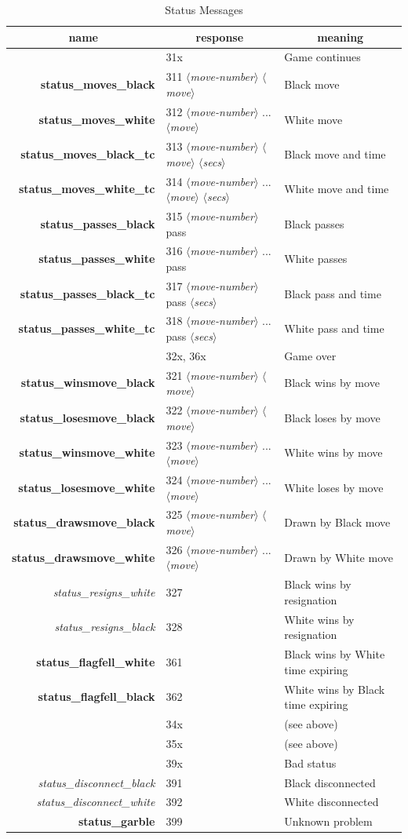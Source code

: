 \documentclass{article}
\newenvironment{resptab}[2]{
\begin{table}%
\centering
\caption{#2}%
\label{table-#1}%
\begin{tabular}{rll}%
\multicolumn{1}{c}{\bf name}&%
\multicolumn{1}{c}{\bf response}&%
\multicolumn{1}{c}{\bf meaning}\\\hline
}{\end{tabular}%
\end{table}}
\newcommand{\stok}[1]{{$\langle${\em #1}$\rangle$}}
\newcommand{\bfid}[1]{{\bf #1}}
\newcommand{\itid}[1]{{\it #1}}
\begin{document}
\begin{resptab}{statusmsgs}{Status Messages}
& 31x			     & Game continues \\
\bfid{status\_moves\_black} & 311 \stok{move-number} \stok{move}     & Black move \\
\bfid{status\_moves\_white} & 312 \stok{move-number} ... \stok{move} & White move \\
\bfid{status\_moves\_black\_tc} & 313 \stok{move-number}
                                  \stok{move}
				  \stok{secs}
				& Black move and time\\
\bfid{status\_moves\_white\_tc} & 314 \stok{move-number}
			  ... \stok{move}
			  \stok{secs}
			& White move and time \\
\bfid{status\_passes\_black} & 315 \stok{move-number} pass & Black passes \\
\bfid{status\_passes\_white} & 316 \stok{move-number}
... pass & White passes \\
\bfid{status\_passes\_black\_tc} & 317 \stok{move-number}
pass \stok{secs} & Black pass and time \\
\bfid{status\_passes\_white\_tc} & 318 \stok{move-number}
... pass \stok{secs} & White pass and time \\
& 32x, 36x			     & Game over \\
\bfid{status\_winsmove\_black} & 321 \stok{move-number} \stok{move}     & Black wins by move \\
\bfid{status\_losesmove\_black} & 322 \stok{move-number} \stok{move}     & Black loses by move \\
\bfid{status\_winsmove\_white} & 323 \stok{move-number} ... \stok{move} & White wins by move \\
\bfid{status\_losesmove\_white} & 324 \stok{move-number} ... \stok{move} & White loses by move \\
\bfid{status\_drawsmove\_black} & 325 \stok{move-number} \stok{move} & Drawn by Black move \\
\bfid{status\_drawsmove\_white} & 326 \stok{move-number} ... \stok{move} & Drawn by White move \\
\itid{status\_resigns\_white} & 327			     & Black wins by resignation \\
\itid{status\_resigns\_black} & 328			     & White wins by resignation \\
\bfid{status\_flagfell\_white} & 361 & Black wins by White time expiring \\
\bfid{status\_flagfell\_black} & 362 & White wins by Black time expiring \\
& 34x		             & (see above) \\
& 35x			     & (see above) \\
& 39x			     & Bad status \\
\itid{status\_disconnect\_black} & 391			     & Black disconnected \\
\itid{status\_disconnect\_white} & 392			     & White disconnected \\
\bfid{status\_garble} & 399			     & Unknown problem
\end{resptab}
\end{document}
